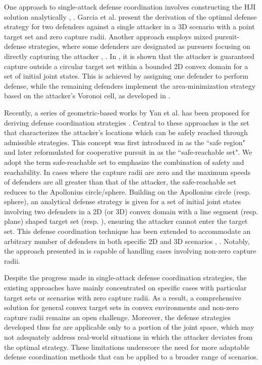\documentclass[journal]{IEEEtran}
\newcommand{\1}{\mathbf{1}}
\begin{document}
One approach to single-attack defense coordination involves constructing the HJI solution analytically \cite{garcia2020optimal}, \cite{fu2023justification}. Garcia et al. \cite{garcia2020optimal} present the derivation of the optimal defense strategy for two defenders against a single attacker in a 3D scenario with a point target set and zero capture radii. Another approach employs mixed pursuit-defense strategies, where some defenders are designated as pursuers focusing on directly capturing the attacker \cite{pan2012pursuit}, \cite{deng2020multi}. In \cite{deng2020multi}, it is shown that the attacker is guaranteed capture outside a circular target set within a bounded 2D convex domain for a set of initial joint states. This is achieved by assigning one defender to perform defense, while the remaining defenders implement the area-minimization strategy based on the attacker's Voronoi cell, as developed in \cite{huang2011guaranteed,pierson2016intercepting}. 

Recently, a series of geometric-based works by Yan et al. has been proposed for deriving defense coordination strategies \cite{yan2018reach,yan2019task,yan2020guarding,yan2022matching}. Central to these approaches is the set that characterizes the attacker's locations which can be safely reached through admissible strategies. This concept was first introduced in \cite{isaacs1999differential} as the ``safe region" and later reformulated for cooperative pursuit in \cite{zhou2016cooperative} as the ``safe-reachable set". We adopt the term safe-reachable set to emphasize the combination of safety and reachability. In cases where the capture radii are zero and the maximum speeds of defenders are all greater than that of the attacker, the safe-reachable set reduces to the Apollonius circle/sphere. Building on the Apollonius circle (resp. sphere), an analytical defense strategy is given for a set of initial joint states involving two defenders in a 2D (or 3D) convex domain with a line segment (resp. plane) shaped target set \cite{yan2018reach} (resp. \cite{yan2020guarding}), ensuring the attacker cannot enter the target set. This defense coordination technique has been extended to accommodate an arbitrary number of defenders in both specific 2D and 3D scenarios \cite{yan2019task}, \cite{yan2022matching}. Notably, the approach presented in \cite{yan2022matching} is capable of handling cases involving non-zero capture radii.

Despite the progress made in single-attack defense coordination strategies, the existing approaches have mainly concentrated on specific cases with particular target sets or scenarios with zero capture radii. As a result, a comprehensive solution for general convex target sets in convex environments and non-zero capture radii remains an open challenge. Moreover, the defense strategies developed thus far are applicable only to a portion of the joint space, which may not adequately address real-world situations in which the attacker deviates from the optimal strategy. These limitations underscore the need for more adaptable defense coordination methods that can be applied to a broader range of scenarios.
\end{document}
